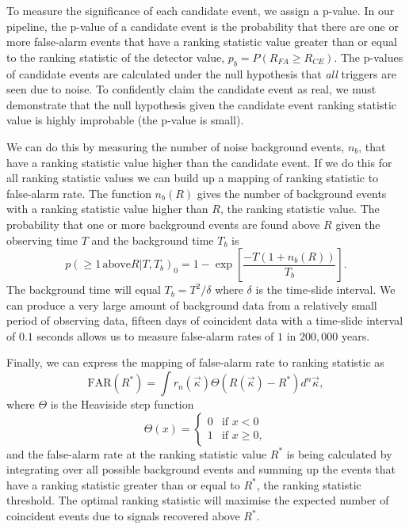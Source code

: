 To measure the significance of each candidate event, we assign a p-value. In our pipeline, the p-value of a candidate event is the probability that there are one or more false-alarm events that have a ranking statistic value greater than or equal to the ranking statistic of the detector value, $p_{b} = P(R_{FA} \ge R_{CE})$. The p-values of candidate events are calculated under the null hypothesis that \textit{all} triggers are seen due to noise. To confidently claim the candidate event as real, we must demonstrate that the null hypothesis given the candidate event ranking statistic value is highly improbable (the p-value is small).

We can do this by measuring the number of noise background events, $n_{b}$, that have a ranking statistic value higher than the candidate event. If we do this for all ranking statistic values we can build up a mapping of ranking statistic to false-alarm rate. The function $n_{b}(R)$ gives the number of background events with a ranking statistic value higher than $R$, the ranking statistic value. The probability that one or more background events are found above $R$ given the observing time $T$ and the background time $T_{b}$ is~\cite{PyCBC:2016}
%
\begin{equation}
    p(\ge 1 \, \text{above} R|T, T_{b})_{0} = 1 - \exp \left[\frac{-T(1 + n_{b}(R))}{T_{b}}\right].
\end{equation}
%
The background time will equal $T_{b} = T^{2}/\delta$ where $\delta$ is the time-slide interval. We can produce a very large amount of background data from a relatively small period of observing data, fifteen days of coincident data with a time-slide interval of $0.1$ seconds allows us to measure false-alarm rates of $1$ in $200,000$ years.

Finally, we can express the mapping of false-alarm rate to ranking statistic as
%
\begin{equation}
    \text{FAR}(R^{*}) = \int r_{n}(\vec{\kappa}) \Theta(R(\vec{\kappa}) - R^{*}) d^{n}\vec{\kappa},
    \label{2:eq:far_mapping}
\end{equation}
%
where $\Theta$ is the Heaviside step function
%
\begin{equation}
    \Theta(x) =
    \begin{cases} 
        0 & \text{if } x < 0 \\
        1 & \text{if } x \geq 0,
    \end{cases}
\end{equation}
%
and the false-alarm rate at the ranking statistic value $R^{*}$ is being calculated by integrating over all possible background events and summing up the events that have a ranking statistic greater than or equal to $R^{*}$, the ranking statistic threshold. The optimal ranking statistic will maximise the expected number of coincident events due to signals recovered above $R^{*}$.

